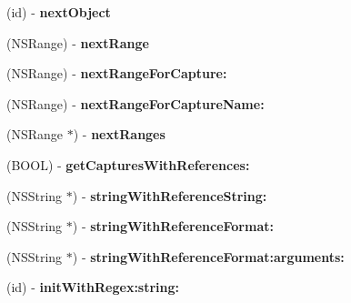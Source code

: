\begin{DoxyCompactItemize}
\item 
\hypertarget{interface_r_k_enumerator_a61ed4826271f0a4b28442c3068938cb4}{(id) -\/ {\bfseries next\-Object}}\label{interface_r_k_enumerator_a61ed4826271f0a4b28442c3068938cb4}

\item 
\hypertarget{interface_r_k_enumerator_a91fbeeac55fb651ff57d2dde85dda012}{(N\-S\-Range) -\/ {\bfseries next\-Range}}\label{interface_r_k_enumerator_a91fbeeac55fb651ff57d2dde85dda012}

\item 
\hypertarget{interface_r_k_enumerator_a52cf789fbf7fb3cbf4ed1032fa136017}{(N\-S\-Range) -\/ {\bfseries next\-Range\-For\-Capture\-:}}\label{interface_r_k_enumerator_a52cf789fbf7fb3cbf4ed1032fa136017}

\item 
\hypertarget{interface_r_k_enumerator_a4095a601af15dd62836adeb7105f88da}{(N\-S\-Range) -\/ {\bfseries next\-Range\-For\-Capture\-Name\-:}}\label{interface_r_k_enumerator_a4095a601af15dd62836adeb7105f88da}

\item 
\hypertarget{interface_r_k_enumerator_abbc9000769aeff849cf72e7ab527f760}{(N\-S\-Range $\ast$) -\/ {\bfseries next\-Ranges}}\label{interface_r_k_enumerator_abbc9000769aeff849cf72e7ab527f760}

\item 
\hypertarget{interface_r_k_enumerator_a1c0b4f336d4d2d43502f1589eab6023e}{(B\-O\-O\-L) -\/ {\bfseries get\-Captures\-With\-References\-:}}\label{interface_r_k_enumerator_a1c0b4f336d4d2d43502f1589eab6023e}

\item 
\hypertarget{interface_r_k_enumerator_a5fb7502952ee16f65bf61fa9c4ac72f3}{(N\-S\-String $\ast$) -\/ {\bfseries string\-With\-Reference\-String\-:}}\label{interface_r_k_enumerator_a5fb7502952ee16f65bf61fa9c4ac72f3}

\item 
\hypertarget{interface_r_k_enumerator_a541989a32e34fd28d84006904a96bd31}{(N\-S\-String $\ast$) -\/ {\bfseries string\-With\-Reference\-Format\-:}}\label{interface_r_k_enumerator_a541989a32e34fd28d84006904a96bd31}

\item 
\hypertarget{interface_r_k_enumerator_a22ac0d889cf2c09c315ac08f2c750cf7}{(N\-S\-String $\ast$) -\/ {\bfseries string\-With\-Reference\-Format\-:arguments\-:}}\label{interface_r_k_enumerator_a22ac0d889cf2c09c315ac08f2c750cf7}

\item 
\hypertarget{interface_r_k_enumerator_ab45fb744d0bc3a2aee41f469f4b0a986}{(id) -\/ {\bfseries init\-With\-Regex\-:string\-:}}\label{interface_r_k_enumerator_ab45fb744d0bc3a2aee41f469f4b0a986}


\end{DoxyCompactItemize}
